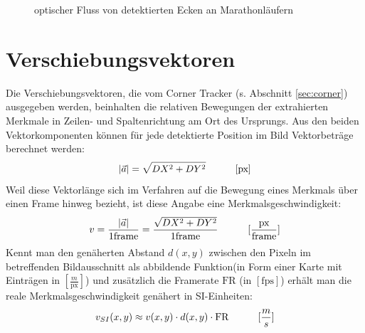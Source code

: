 \vskip 5pt
\begin{figure}[h]
  \centering
  \caption{optischer Fluss von detektierten Ecken an Marathonläufern \cite{AliS07}}
  \label{gaussians}
\end{figure}

\section{Verschiebungsvektoren}
\label{sec:planes}

Die Verschiebungsvektoren, die vom Corner Tracker (s. Abschnitt \ref{sec:corner}) ausgegeben werden, beinhalten die relativen Bewegungen der extrahierten Merkmale in Zeilen- und Spaltenrichtung am Ort des Ursprungs. Aus den beiden Vektorkomponenten können für jede detektierte Position im Bild Vektorbeträge berechnet werden:\\
\begin{equation}
\lvert\vec{a}\rvert = \sqrt{DX^2 + DY^2} \hskip 30pt [\text{px}]
\end{equation}
\vskip 5pt
Weil diese Vektorlänge sich im Verfahren auf die Bewegung eines Merkmals über einen Frame hinweg bezieht, ist diese Angabe eine Merkmalsgeschwindigkeit:\\
\begin{equation}
v = \frac{\lvert\vec{a}\rvert}{1\text{frame}} = \frac{\sqrt{DX^2 + DY^2}}{1\text{frame}} \hskip 30pt [\frac{\text{px}}{\text{frame}}]
\end{equation}
\newpage
Kennt man den genäherten Abstand $d(x,y)$ zwischen den Pixeln im betreffenden Bildausschnitt als abbildende Funktion(\zb in Form einer Karte mit Einträgen in $[\frac{m}{\text{px}}]$) und zusätzlich die Framerate $\text{FR}$ (in $[\text{fps}]$) erhält man die reale Merkmalsgeschwindigkeit genähert in SI-Einheiten:\vskip 3pt
\begin{equation}
v_{SI}(x,y) \approx v(x,y)\cdot d(x,y)\cdot\text{FR} \hskip 30pt [\frac{m}{s}]
\end{equation}

